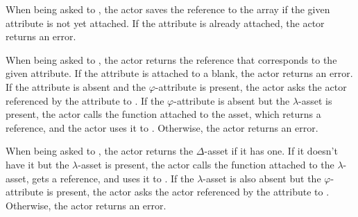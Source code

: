 When being asked to , the actor saves the reference to the array if the given attribute is not yet attached.
If the attribute is already attached, the actor returns an error.

When being asked to , the actor returns the reference that corresponds to the given attribute.
If the attribute is attached to a blank, the actor returns an error.
If the attribute is absent and the \(\varphi\)-attribute is present, the actor asks the actor referenced by the attribute to .
If the \(\varphi\)-attribute is absent but the \(\lambda\)-asset is present, the actor calls the function attached to the asset, which returns a reference, and the actor uses it to .
Otherwise, the actor returns an error.

When being asked to , the actor returns the \(\Delta\)-asset if it has one.
If it doesn't have it but the \(\lambda\)-asset is present, the actor calls the function attached to the \(\lambda\)-asset, gets a reference, and uses it to .
If the \(\lambda\)-asset is also absent but the \(\varphi\)-attribute is present, the actor asks the actor referenced by the attribute to .
Otherwise, the actor returns an error.
